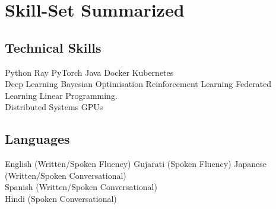 \documentclass[a4paper]{deedy-resume} %
\begin{document}
\section{Skill-Set Summarized}

\begin{minipage}[t]{0.45\textwidth}

\subsection{Technical Skills}
\textbullet{} Python \textbullet{} Ray \textbullet{} PyTorch \textbullet{} Java \textbullet{} Docker \textbullet{} Kubernetes  \\  \textbullet{} Deep Learning \textbullet{} Bayesian Optimisation \textbullet{} Reinforcement Learning \textbullet{} Federated Learning \textbullet{} Linear Programming. \\ \textbullet{} Distributed Systems \textbullet{} GPUs

\end{minipage}
\begin{minipage}[t]{10\textwidth}
\end{minipage}
\begin{minipage}[t]{0.45\textwidth}
\subsection{Languages}
English (Written/Spoken Fluency) \textbullet{} Gujarati (Spoken Fluency) \textbullet{} Japanese (Written/Spoken Conversational) \textbullet{} \\  Spanish (Written/Spoken Conversational)  \textbullet{} \\  Hindi (Spoken Conversational)

\end{minipage}
\end{document}
